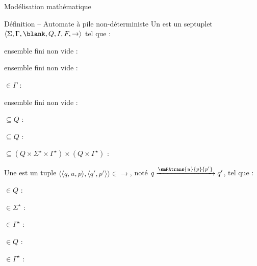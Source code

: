 
\begingroup

\begin{frame}{Modélisation mathématique}

  \vspace{-2mm}
  \begin{block}{Définition -- Automate à pile non-déterministe}
    Un  est un septuplet \alert{$\langle \Sigma, \Gamma, \blank, Q, I, F, \rightarrow \rangle$} tel que :
    \begin{description}[xxxx]
    \item[\alert{$\Sigma$}] ensemble fini non vide : 
    \item[\alert{$\Gamma$}] ensemble fini non vide : 
    \item[\alert{$\blank$}] $\in \Gamma$ : 
    \item[\alert{$Q$}] ensemble fini non vide : 
    \item[\alert{$I$}] $\subseteq Q$ : 
    \item[\alert{$F$}] $\subseteq Q$ : 
    \item[\alert{$\rightarrow$}] $\subseteq  (Q \times \Sigma^\star \times \Gamma^\star) \times (Q \times \Gamma^\star)$ : 
    \end{description}

    \vspace{-1mm}
    Une  est un tuple \alert{$\langle \langle q, u, p \rangle, \langle q', p' \rangle \rangle \in \rightarrow$}, noté \alert{$q \xrightarrow{\smPAtrans{u}{p}{p'}} q'$}, tel que :
    \begin{description}[xxxx]
    \item[\alert{$q$}] $\in Q$ : 
    \item[\alert{$u$}] $\in \Sigma^\star$ : 
    \item[\alert{$p$}] $\in \Gamma^\star$ : 
    \item[\alert{$q'$}] $\in Q$ : 
    \item[\alert{$p'$}] $\in \Gamma^\star$ : 
    \end{description}
  \end{block}


\end{frame}

\endgroup
\endinput
